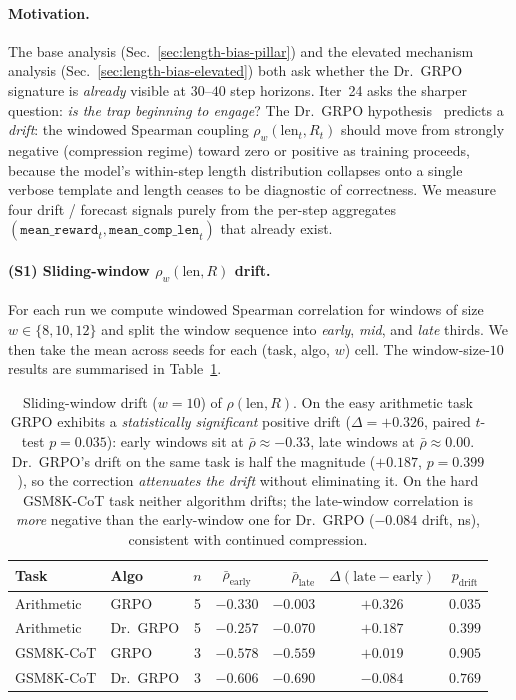 \documentclass{article}
\begin{document}
\paragraph{Motivation.}
The base analysis (Sec.~\ref{sec:length-bias-pillar}) and the
elevated mechanism analysis (Sec.~\ref{sec:length-bias-elevated})
both ask whether the Dr.~GRPO signature is \emph{already} visible
at $30$--$40$ step horizons. Iter~24 asks the sharper question:
\emph{is the trap \emph{beginning} to engage}? The Dr.~GRPO
hypothesis~\cite{tong2025drgrpo} predicts a \emph{drift}: the
windowed Spearman coupling $\rho_w(\mathrm{len}_t, R_t)$ should
move from strongly negative (compression regime) toward zero or
positive as training proceeds, because the model's within-step
length distribution collapses onto a single verbose template and
length ceases to be diagnostic of correctness. We measure four
drift / forecast signals purely from the per-step aggregates
$(\texttt{mean\_reward}_t, \texttt{mean\_comp\_len}_t)$ that
already exist.

\paragraph{(S1) Sliding-window $\rho_w(\mathrm{len}, R)$ drift.}
For each run we compute windowed Spearman correlation for windows
of size $w \in \{8, 10, 12\}$ and split the window sequence into
\emph{early}, \emph{mid}, and \emph{late} thirds. We then take the
mean across seeds for each (task, algo, $w$) cell. The
window-size-$10$ results are summarised in
Table~\ref{tab:length-bias-iter24-drift}.

\begin{table}[htbp]
\centering
\small
\begin{tabular}{llccrcc}
\toprule
Task & Algo & $n$ & $\bar\rho_{\text{early}}$
   & $\bar\rho_{\text{late}}$
   & $\Delta(\text{late}{-}\text{early})$ & $p_{\text{drift}}$ \\
\midrule
Arithmetic   & GRPO     & 5 & $-0.330$ & $-0.003$ & $+0.326$ & $0.035$ \\
Arithmetic   & Dr.~GRPO & 5 & $-0.257$ & $-0.070$ & $+0.187$ & $0.399$ \\
GSM8K-CoT    & GRPO     & 3 & $-0.578$ & $-0.559$ & $+0.019$ & $0.905$ \\
GSM8K-CoT    & Dr.~GRPO & 3 & $-0.606$ & $-0.690$ & $-0.084$ & $0.769$ \\
\bottomrule
\end{tabular}
\caption{Sliding-window drift ($w{=}10$) of $\rho(\mathrm{len}, R)$.
On the easy arithmetic task GRPO exhibits a \emph{statistically
significant} positive drift ($\Delta = +0.326$, paired $t$-test
$p = 0.035$): early windows sit at $\bar\rho \approx -0.33$,
late windows at $\bar\rho \approx 0.00$. Dr.~GRPO's drift on the
same task is half the magnitude ($+0.187$, $p = 0.399$), so the
correction \emph{attenuates the drift} without eliminating it.
On the hard GSM8K-CoT task neither algorithm drifts; the
late-window correlation is \emph{more} negative than the
early-window one for Dr.~GRPO ($-0.084$ drift, ns), consistent
with continued compression.}
\label{tab:length-bias-iter24-drift}
\end{table}
\end{document}
